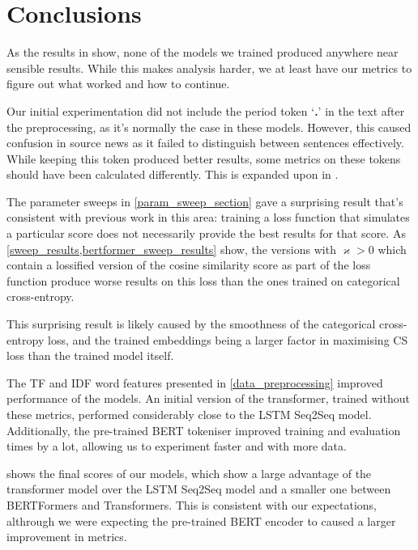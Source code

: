 \section{Conclusions}

As the results in \appendixA{} show, none of the models we trained produced anywhere near sensible results.
While this makes analysis harder, we at least have our metrics to figure out what worked and how to continue.

Our initial experimentation did not include the period token `\textbf{.}' in the text after the preprocessing, as it's normally the case in these models.
However, this caused confusion in source news as it failed to distinguish between sentences effectively.
While keeping this token produced better results, some metrics on these tokens should have been calculated differently.
This is expanded upon in .

The parameter sweeps in \cref{param_sweep_section} gave a surprising result that's consistent with previous work in this area: training a loss function that simulates a particular score does not necessarily provide the best results for that score.
As \cref{sweep_results,bertformer_sweep_results} show, the versions with $\varkappa > 0$ which contain a lossified version of the cosine similarity score as part of the loss function produce worse results on this loss than the ones trained on categorical cross-entropy.

This surprising result is likely caused by the smoothness of the categorical cross-entropy loss, and the trained embeddings being a larger factor in maximising CS loss than the trained model itself.

The TF and IDF word features presented in \cref{data_preprocessing} improved performance of the models.
An initial version of the transformer, trained without these metrics, performed considerably close to the LSTM Seq2Seq model.
Additionally, the pre-trained BERT tokeniser improved training and evaluation times by a lot, allowing us to experiment faster and with more data.

 shows the final scores of our models, which show a large advantage of the transformer model over the LSTM Seq2Seq model and a smaller one between BERTFormers and Transformers.
This is consistent with our expectations, althrough we were expecting the pre-trained BERT encoder to caused a larger improvement in metrics.
